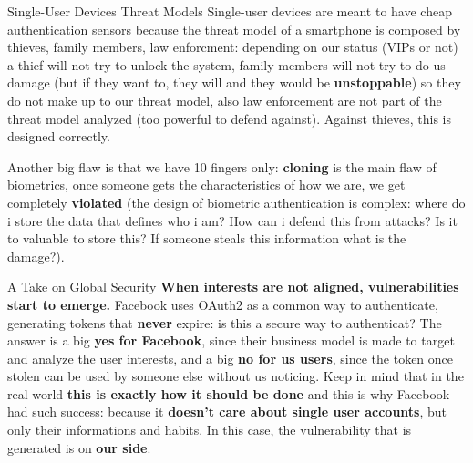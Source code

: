 \begin{warning}{Single-User Devices Threat Models}
    Single-user devices are meant to have cheap authentication sensors because
    the threat model of a smartphone is composed by thieves, family members, 
    law enforcment: depending on our status (VIPs or not) a thief will not try
    to unlock the system, family members will not try to do us damage (but if
    they want to, they will and they would be \textbf{unstoppable}) so they do 
    not make up to our threat model, also law enforcement are not part of the 
    threat model analyzed (too powerful to defend against). Against thieves, 
    this is designed correctly.
\end{warning}

Another big flaw is that we have 10 fingers  only: \textbf{cloning} is the
main flaw of biometrics, once someone gets the characteristics of how we are, 
we get completely \textbf{violated} (the design of biometric authentication 
is complex: where do i store the data that defines who i am? How can i 
defend this from attacks? Is it to valuable to store this? If someone 
steals this information what is the damage?).

\begin{notice}{A Take on Global Security}
    \textbf{When interests are not aligned, vulnerabilities start to emerge.}
    \newline
    Facebook uses OAuth2 as a common way to authenticate, generating tokens
    that \textbf{never} expire: is this a secure way to authenticat? The answer
    is a big \textbf{yes for Facebook}, since their business model is made to 
    target and analyze the user interests, and a big \textbf{no for us users},
    since the token once stolen can be used by someone else without us 
    noticing. Keep in mind that in the real world \textbf{this is exactly
    how it should be done} and this is why Facebook had such success: because
    it \textbf{doesn't care about single user accounts}, but only their 
    informations and habits. In this case, the vulnerability that is generated
    is on \textbf{our side}.
\end{notice}